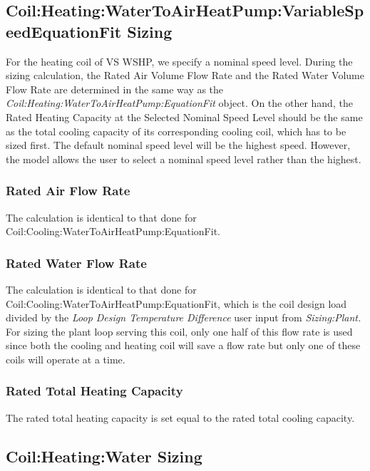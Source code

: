 \subsection{Coil:Heating:WaterToAirHeatPump:VariableSpeedEquationFit Sizing}\label{coilheatingwatertoairheatpumpvariablespeedequationfit-sizing}

For the heating coil of VS WSHP, we specify a nominal speed level. During the sizing calculation, the Rated Air Volume Flow Rate and the Rated Water Volume Flow Rate are determined in the same way as the \emph{Coil:Heating:WaterToAirHeatPump:EquationFit} object. On the other hand, the Rated Heating Capacity at the Selected Nominal Speed Level should be the same as the total cooling capacity of its corresponding cooling coil, which has to be sized first. The default nominal speed level will be the highest speed. However, the model allows the user to select a nominal speed level rather than the highest.

\subsubsection{Rated Air Flow Rate}\label{rated-air-flow-rate-3}

The calculation is identical to that done for Coil:Cooling:WaterToAirHeatPump:EquationFit.

\subsubsection{Rated Water Flow Rate}\label{rated-water-flow-rate-3}

The calculation is identical to that done for Coil:Cooling:WaterToAirHeatPump:EquationFit, which is the coil design load divided by the \emph{Loop Design Temperature Difference} user input from \emph{Sizing:Plant.} For sizing the plant loop serving this coil, only one half of this flow rate is used since both the cooling and heating coil will save a flow rate but only one of these coils will operate at a time.

\subsubsection{Rated Total Heating Capacity}\label{rated-total-heating-capacity-1}

The rated total heating capacity is set equal to the rated total cooling capacity.

\subsection{Coil:Heating:Water Sizing}\label{coilheatingwater-sizing}

